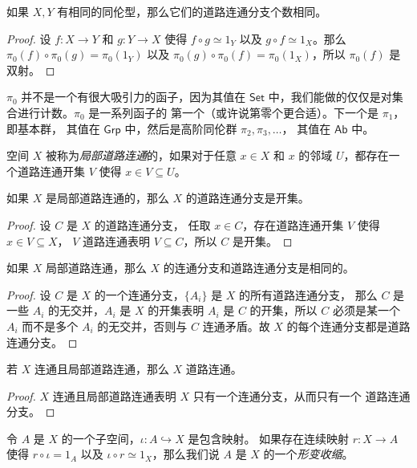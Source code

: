 \documentclass[fontset=none]{Notes}
\newcommand{\cat}[1]{\mathsf{#1}}
\begin{document}
\begin{corollary}
  如果 $X,Y$ 有相同的同伦型，那么它们的道路连通分支个数相同。
\end{corollary}
\begin{proof}
  设 $f:X\to Y$ 和 $g:Y\to X$ 使得 $f\circ g\simeq 1_Y$ 以及
  $g\circ f\simeq 1_X$。那么 $\pi_0(f)\circ\pi_0(g)=\pi_0(1_Y)$
  以及 $\pi_0(g)\circ\pi_0(f)=\pi_0(1_X)$，所以 $\pi_0(f)$
  是双射。
\end{proof}

$\pi_0$ 并不是一个有很大吸引力的函子，因为其值在 $\cat{Set}$
中，我们能做的仅仅是对集合进行计数。$\pi_0$ 是一系列函子的
第一个（或许说第零个更合适）。下一个是 $\pi_1$，即基本群，
其值在 $\cat{Grp}$ 中，然后是高阶同伦群 $\pi_2,\pi_3,\dots$，
其值在 $\cat{Ab}$ 中。

\begin{definition}
  空间 $X$ 被称为\emph{局部道路连通}的，如果对于任意 $x\in X$
  和 $x$ 的邻域 $U$，都存在一个道路连通开集 $V$ 使得 $x\in V\subseteq U$。
\end{definition}

\begin{theorem}
  如果 $X$ 是局部道路连通的，那么 $X$
  的道路连通分支是开集。
\end{theorem}
\begin{proof}
  设 $C$ 是 $X$ 的道路连通分支，
  任取 $x\in C$，存在道路连通开集 $V$ 使得 $x\in V\subseteq X$，
  $V$ 道路连通表明 $V\subseteq C$，所以 $C$ 是开集。
\end{proof}

\begin{corollary}
  如果 $X$ 局部道路连通，那么 $X$ 的连通分支和道路连通分支是相同的。
\end{corollary}
\begin{proof}
  设 $C$ 是 $X$ 的一个连通分支，$\{A_i\}$ 是 $X$ 的所有道路连通分支，
  那么 $C$ 是一些 $A_i$ 的无交并，$A_i$ 是 $X$ 的开集表明 $A_i$
  是 $C$ 的开集，所以 $C$ 必须是某一个 $A_i$ 而不是多个 $A_i$
  的无交并，否则与 $C$ 连通矛盾。故 $X$ 的每个连通分支都是道路连通分支。
\end{proof}

\begin{corollary}
  若 $X$ 连通且局部道路连通，那么 $X$ 道路连通。
\end{corollary}
\begin{proof}
  $X$ 连通且局部道路连通表明 $X$ 只有一个连通分支，从而只有一个
  道路连通分支。
\end{proof}

\begin{definition}
  令 $A$ 是 $X$ 的一个子空间，$\iota:A\hookrightarrow X$ 是包含映射。
  如果存在连续映射 $r:X\to A$ 使得 $r\circ \iota=1_A$
  以及 $\iota\circ r\simeq 1_X$，那么我们说 $A$ 是 $X$
  的一个\emph{形变收缩}。
\end{definition}
\end{document}
